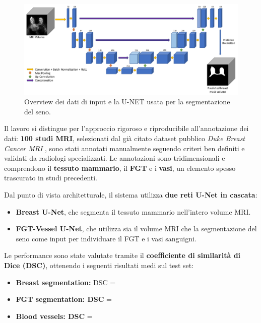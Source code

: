 \begin{figure}[H] 
  	\centering 
 	\includegraphics[width=\textwidth]{images/2025-07-07-12-01-04.png} 
	 \caption{Overview dei dati di input e la U-NET usata per la segmentazione del seno.}
    \label{fig:schema_segmentazione_seno_paper}
 \end{figure} 

Il lavoro si distingue per l’approccio rigoroso e riproducibile all’annotazione dei dati: \textbf{100 studi MRI}, selezionati dal già citato dataset pubblico \textit{Duke Breast Cancer MRI} \cite{duke_breast_mri}, sono stati annotati manualmente seguendo criteri ben definiti e validati da radiologi specializzati. Le annotazioni sono tridimensionali e comprendono il \textbf{tessuto mammario}, il \textbf{FGT} e i \textbf{vasi}, un elemento spesso trascurato in studi precedenti.

Dal punto di vista architetturale, il sistema utilizza \textbf{due reti U-Net in cascata}:
\begin{itemize}
\item \textbf{Breast U-Net}, che segmenta il tessuto mammario nell’intero volume MRI.
\item \textbf{FGT-Vessel U-Net}, che utilizza sia il volume MRI che la segmentazione del seno come input per individuare il FGT e i vasi sanguigni.
\end{itemize}

Le performance sono state valutate tramite il \textbf{coefficiente di similarità di Dice (DSC)}, ottenendo i seguenti risultati medi sul test set:
\begin{itemize}
\item \textbf{Breast segmentation:} DSC = 
\item \textbf{FGT segmentation: DSC} = 
\item \textbf{Blood vessels: DSC} = 
\end{itemize}

